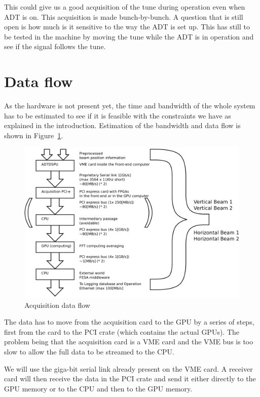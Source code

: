 This could give us a good acquisition of the \gls{tune} during operation even when \gls{ADT} is on. This acquisition is made bunch-by-bunch. A question that is still open is how much is it sensitive to the way the \gls{ADT} is set up. This has still to be tested in the machine by moving the tune while the \gls{ADT} is in operation and see if the signal follows the tune.

\section{Data flow}

As the hardware is not present yet, the time and bandwidth of the whole system has to be estimated to see if it is feasible with the constraints we have as explained in the introduction. Estimation of the bandwidth and data flow is shown in Figure~\ref{fig:data_flow}.

\begin{figure}[H]
\caption{Acquisition data flow}
\label{fig:data_flow}
\centering
\includegraphics[scale=0.3]{dataflow.pdf}
\end{figure}

The data has to move from the acquisition card to the GPU by a series of steps, first from the card to the PCI crate (which contains the actual \glspl{GPU}). The problem being that the acquisition card is a \gls{VME} card and the VME bus is too slow to allow the full data to be streamed to the \gls{CPU}. 

We will use the giga-bit serial link already present on the VME
card. A receiver card will then receive the data in the PCI crate and
send it either directly to the \gls{GPU} memory or to the \gls{CPU}
and then to the \gls{GPU} memory.

